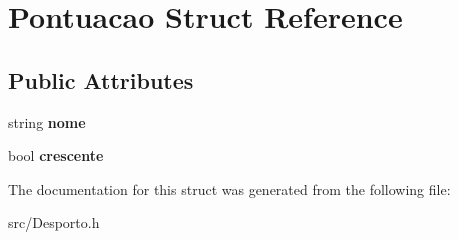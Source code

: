 \hypertarget{struct_pontuacao}{}\section{Pontuacao Struct Reference}
\label{struct_pontuacao}
\subsection*{Public Attributes}
\begin{DoxyCompactItemize}
\item 
\hypertarget{struct_pontuacao_aa7d32400b2cc13f174fbd2c7a9c9d032}{}string {\bfseries nome}\label{struct_pontuacao_aa7d32400b2cc13f174fbd2c7a9c9d032}

\item 
\hypertarget{struct_pontuacao_a8b8590bcfcf51442e19e7384ecc8c446}{}bool {\bfseries crescente}\label{struct_pontuacao_a8b8590bcfcf51442e19e7384ecc8c446}

\end{DoxyCompactItemize}


The documentation for this struct was generated from the following file\+:\begin{DoxyCompactItemize}
\item 
src/Desporto.\+h\end{DoxyCompactItemize}
